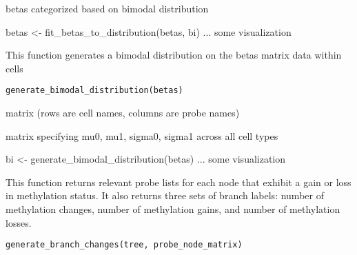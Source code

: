 \documentclass[a4paper]{book}
\begin{document}
%
\begin{Value}
betas categorized based on bimodal distribution
\end{Value}
%
\begin{Examples}
\begin{ExampleCode}
betas <- fit_betas_to_distribution(betas, bi)
... some visualization 
\end{ExampleCode}
\end{Examples}
%
\begin{Description}\relax
This function generates a bimodal distribution on the betas matrix data 
within cells
\end{Description}
%
\begin{Usage}
\begin{verbatim}
generate_bimodal_distribution(betas)
\end{verbatim}
\end{Usage}
%
\begin{Arguments}
\begin{ldescription}
\item[\code{betas}] matrix (rows are cell names, columns are probe names)
\end{ldescription}
\end{Arguments}
%
\begin{Value}
matrix specifying mu0, mu1, sigma0, sigma1 across all cell types
\end{Value}
%
\begin{Examples}
\begin{ExampleCode}
bi <- generate_bimodal_distribution(betas)
... some visualization 
\end{ExampleCode}
\end{Examples}
%
\begin{Description}\relax
This function returns relevant probe lists for each node that exhibit a 
gain or loss in methylation status. It also returns three sets of branch 
labels: number of methylation changes, number of methylation gains, and 
number of methylation losses.
\end{Description}
%
\begin{Usage}
\begin{verbatim}
generate_branch_changes(tree, probe_node_matrix)
\end{verbatim}
\end{Usage}
\end{document}
